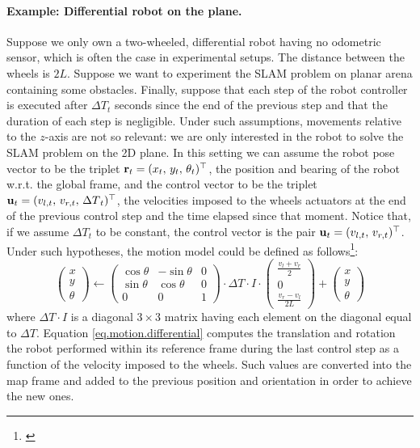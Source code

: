 	\paragraph{Example: Differential robot on the plane.}
		Suppose we only own a two-wheeled, differential robot having no odometric sensor, which is often the case in experimental setups.
		The distance between the wheels is $2L$.
		Suppose we want to experiment the SLAM problem on planar arena containing some obstacles.
		Finally, suppose that each step of the robot controller is executed after ${\Delta T}_t$ seconds since the end of the previous step and that the duration of each step is negligible.
		Under such assumptions, movements relative to the $z$-axis are not so relevant: we are only interested in the robot to solve the SLAM problem on the 2D plane.
		In this setting we can assume the robot pose vector to be the triplet $\boldsymbol{\mathrm{{r}}}_t = (x_t,\, y_t,\, \theta_t)^\top$, \ie{} the position and bearing of the robot w.r.t. the global frame, and the control vector to be the triplet $\boldsymbol{\mathrm{{u}}}_t = (v_{l,t},\, v_{r,t},\, {\Delta T}_t)^\top$, \ie{} the velocities imposed to the wheels actuators at the end of the previous control step and the time elapsed since that moment.
		Notice that, if we assume ${\Delta T}_t$ to be constant, the control vector is the pair $\boldsymbol{\mathrm{{u}}}_t = (v_{l,t},\, v_{r,t})^\top$.
		Under such hypotheses, the motion model could be defined as follows\footnote{\label{sec.models.alert}\notationAlert}:
		\begin{equation}
			\label{eq.motion.differential}
			\left(\begin{array}{c}
				x \\ y \\ \theta
			\end{array}\right)
			\leftarrow
			\left(\begin{array}{ccc}
				\cos{\theta} & -\sin{\theta} & 0 \\
				\sin{\theta} & \cos{\theta} & 0 \\
				0 & 0 & 1
			\end{array}\right)
			\cdot {\Delta T} \cdot I \cdot
			\left(\begin{array}{c}
				\frac{v_l + v_r}{2} \\ 
				0 \\
				\frac{v_r - v_l}{2L}
			\end{array}\right)
			+
			\left(\begin{array}{c}
				x \\ y \\ \theta
			\end{array}\right)
		\end{equation}
		where ${\Delta T} \cdot I$ is a diagonal $3 \times 3$ matrix having each element on the diagonal equal to ${\Delta T}$.
		Equation \ref{eq.motion.differential} computes the translation and rotation the robot performed within its reference frame during the last control step as a function of the velocity imposed to the wheels. 
		Such values are converted into the map frame and added to the previous position and orientation in order to achieve the new ones. 
		
